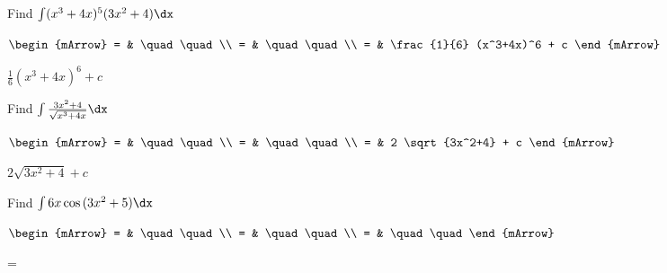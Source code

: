 \begin{mtask}[resume]
   \task \begin{exercise} Find $\int (x^3+4x)^5 (3x^2+4) \dx$
           \begin{envSolution}
             $\begin{mArrow}
                 = & \quad \quad              \\
		   		 = & \quad \quad              \\
				 = & \frac{1}{6} (x^3+4x)^6 + c 
              \end{mArrow}$
            \begin{shortsolution}  
			     $\frac{1}{6} (x^3+4x)^6 + c$
			\end{shortsolution}				 
           \end{envSolution}
         \end{exercise}

   \task \begin{exercise} Find $\int \frac{3x^2+4}{\sqrt{x^3+4x}}  \dx$
           \begin{envSolution}
             $\begin{mArrow}
                 = & \quad \quad              \\
		   		 = & \quad \quad              \\
				 = & 2 \sqrt{3x^2+4} + c 
              \end{mArrow}$
            \begin{shortsolution}  
			     $2 \sqrt{3x^2+4} + c$
			\end{shortsolution}				 
           \end{envSolution}
         \end{exercise}


   \task \begin{exercise} Find $\int 6x \cos{(3x^2+5)} \dx$
           \begin{envSolution}
             $\begin{mArrow}
                 = & \quad \quad              \\
		   		 = & \quad \quad              \\
				 = & \quad \quad 
              \end{mArrow}$
            \begin{shortsolution}  
			     =$ \quad \quad \quad \quad$
			\end{shortsolution}				 
           \end{envSolution}
         \end{exercise}


\end{mtask}
